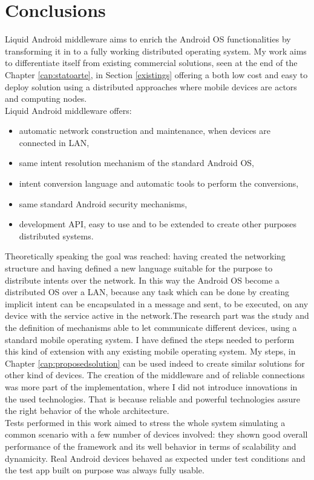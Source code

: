\section{Conclusions}
Liquid Android middleware aims to enrich the Android OS functionalities by transforming it in to a fully working distributed operating system. My work aims to differentiate itself from existing commercial solutions, seen at the end of the Chapter \ref{cap:statoarte}, in Section \ref{existings} offering a both low cost and easy to deploy solution using a distributed approaches where mobile devices are actors and computing nodes.\\
Liquid Android middleware offers:
\begin{itemize}
	\item automatic network construction and maintenance, when devices are connected in LAN,
	\item same intent resolution mechanism of the standard Android OS,
	\item intent conversion language and automatic tools to perform the conversions,
	\item same standard Android security mechanisms,
	\item development API, easy to use and to be extended to create other purposes distributed systems.
\end{itemize}
Theoretically speaking the goal was reached: having created the networking structure and having defined a new language suitable for the purpose to distribute intents over the network. In this way the Android OS become a distributed OS over a LAN, because any task which can be done by creating implicit intent can be encapsulated in a message and sent, to be executed, on any device with the service active in the network.The research part
was the study and the definition of mechanisms able to let communicate different devices, using a standard mobile operating system. I have defined the steps needed to perform this kind of extension with any existing mobile operating system. My steps, in Chapter \ref{cap:proposedsolution} can be used indeed to create similar solutions for other kind of devices. The creation of the middleware and of reliable connections was more part of the implementation, where I did not introduce innovations in the used technologies. That is because reliable and powerful technologies assure the right behavior of the whole architecture.\\
Tests performed in this work aimed to stress the whole system simulating a common scenario with a few number of devices involved: they shown good overall performance of the framework and its well behavior in terms of scalability and dynamicity. Real Android devices behaved as expected under test conditions and the test app built on purpose was always fully usable.\\
